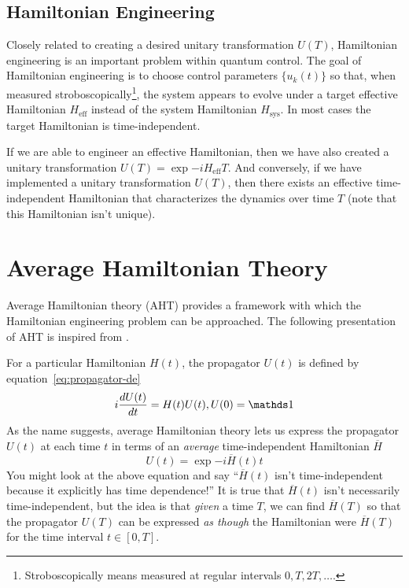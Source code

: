 
\subsection{Hamiltonian Engineering}

Closely related to creating a desired unitary transformation $U(T)$, Hamiltonian engineering is an important problem within quantum control. The goal of Hamiltonian engineering is to choose control parameters $\{u_k(t)\}$ so that, when measured stroboscopically\footnote{Stroboscopically means measured at regular intervals $0, T, 2T, \dots$.}, the system appears to evolve under a target effective Hamiltonian $H_{\text{eff}}$ instead of the system Hamiltonian $H_{\text{sys}}$. In most cases the target Hamiltonian is time-independent.

If we are able to engineer an effective Hamiltonian, then we have also created a unitary transformation $U(T) = \exp{-i H_{\text{eff}} T}$. And conversely, if we have implemented a unitary transformation $U(T)$, then there exists an effective time-independent Hamiltonian that characterizes the dynamics over time $T$ (note that this Hamiltonian isn't unique).


\section{Average Hamiltonian Theory}\label{sec:AHT}

Average Hamiltonian theory (AHT) provides a framework with which the Hamiltonian engineering problem can be approached. The following presentation of AHT is inspired from \cite{brinkmann_2016, gerstein-dybowski, 1976ii}.

For a particular Hamiltonian $H(t)$, the propagator $U(t)$ is defined by equation~\ref{eq:propagator-de}
\[
i \ddt{U(t)} = H(t) U(t), U(0) = \identity
\]
As the name suggests, average Hamiltonian theory lets us express the propagator $U(t)$ at each time $t$ in terms of an \emph{average} time-independent Hamiltonian $\overline{H}$
\[
U(t) = \exp{-i \overline{H}(t) t}
\]
You might look at the above equation and say ``$\overline{H}(t)$ isn't time-independent because it explicitly has time dependence!'' It is true that $\overline{H}(t)$ isn't necessarily time-independent, but the idea is that \emph{given} a time $T$, we can find $\overline{H}(T)$ so that the propagator $U(T)$ can be expressed \emph{as though} the Hamiltonian were $\overline{H}(T)$ for the time interval $t \in [0, T]$.

